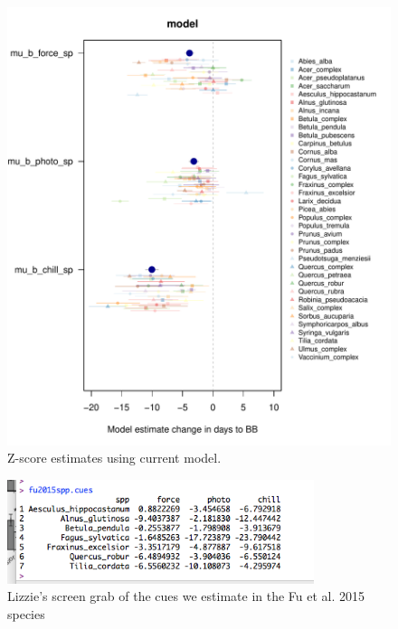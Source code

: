 \documentclass[11pt,letterpaper]{article}
\begin{document}
\begin{figure}[t!]
\centering
\includegraphics[width=1\textwidth]{..//..//analyses/bb_analysis/figures/muplotmodelspcom_expramp_fp.pdf}
\caption{Z-score estimates using current model.}
  \label{fig:zscore}
\end{figure}
\clearpage

\begin{figure}[t!]
\centering
\includegraphics[width=0.8\textwidth]{figures/fuspp.png}
\caption{Lizzie's screen grab of the cues we estimate in the Fu et al. 2015 species}
  \label{fig:fuspp}
\end{figure}
\clearpage
\end{document}
